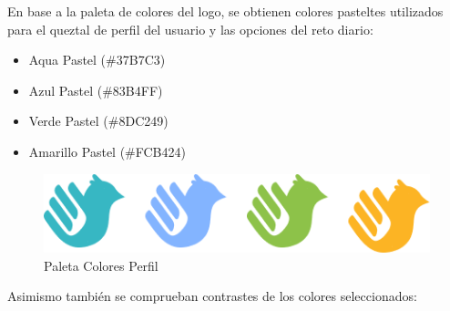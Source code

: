 En base a la paleta de colores del logo, se obtienen colores pasteltes utilizados para el queztal de perfil del usuario y las opciones del reto diario:

\begin{itemize}

    \item Aqua Pastel (\#37B7C3)
    \item Azul Pastel (\#83B4FF)
    \item Verde Pastel (\#8DC249)
    \item Amarillo Pastel (\#FCB424)

\end{itemize}

\begin{figure} [H]
    \centering
    \includegraphics[width=0.5\linewidth]{figuras/paleta_colores_quetzal.png}
    \caption{Paleta Colores Perfil}
    \label{fig:enter-label}
\end{figure}

Asimismo también se comprueban contrastes de los colores seleccionados:

